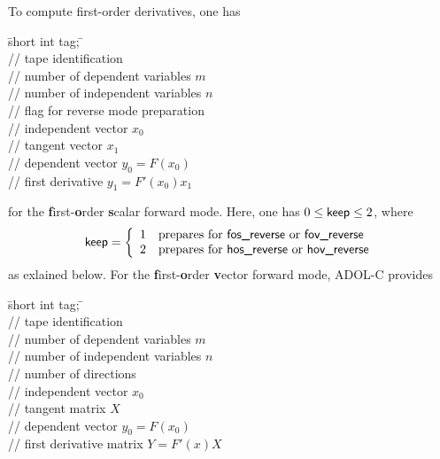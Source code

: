 \documentclass[11pt,twoside]{article}
\begin{document}
To compute first-order derivatives, one has
\begin{tabbing}
\hspace{0.5in}\={\sf short int tag;} \hspace{1.1in}\= \kill    %
\\
         \> // tape identification \\
                 \> // number of  dependent variables $m$\\
                 \> // number of independent variables $n$\\
              \> // flag for reverse mode preparation\\
          \> // independent vector $x_0$\\
          \> // tangent vector $x_1$\\
          \> // dependent vector $y_0=F(x_0)$\\
          \> // first derivative $y_1=F'(x_0)x_1$
\end{tabbing}                 
for the {\bf f}irst-{\bf o}rder {\bf s}calar forward mode. Here, one has
$0\leq\text{\sf keep}\leq 2$, where 
\begin{align*}
\text{\sf keep} = \left\{\begin{array}{cl}
       1 & \text{prepares for {\sf fos\_reverse} or {\sf fov\_reverse}} \\
       2 & \text{prepares for {\sf hos\_reverse} or {\sf hov\_reverse}}
       \end{array}\right.
\end{align*}
as exlained below. For the {\bf f}irst-{\bf o}rder {\bf v}ector forward mode,
ADOL-C provides
\begin{tabbing}
\hspace{0.5in}\={\sf short int tag;} \hspace{1.1in}\= \kill    %
\\
         \> // tape identification \\
                 \> // number of  dependent variables $m$\\
                 \> // number of independent variables $n$\\
                 \> // number of directions\\
          \> // independent vector $x_0$\\
        \> // tangent matrix $X$\\
          \> // dependent vector $y_0=F(x_0)$\\
        \> // first derivative matrix $Y=F'(x)X$
\end{tabbing}                 
\end{document}
